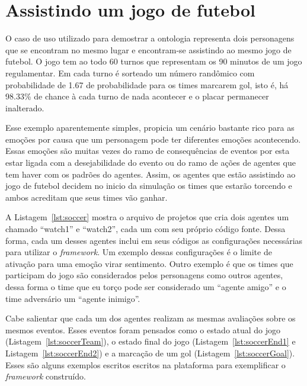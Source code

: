 \section{Assistindo um jogo de futebol} \label{ch:cdu:svc}

O caso de uso utilizado para demostrar a ontologia representa dois personagens
que se encontram no mesmo lugar e encontram-se assistindo ao mesmo jogo de
futebol. O jogo tem ao todo 60 turnos que representam os 90 minutos de um jogo
regulamentar. Em cada turno é sorteado um número randômico com probabilidade
de 1.67 de probabilidade para os times marcarem gol, isto é, há 98.33\% de
chance à cada turno de nada acontecer e o placar permanecer inalterado.

Esse exemplo aparentemente simples, propicia um cenário bastante rico para as
emoções por causa que um personagem pode ter diferentes emoções acontecendo.
Essas emoções são muitas vezes do ramo de consequências de eventos por esta
estar ligada com a desejabilidade do evento ou do ramo de ações de agentes que
tem haver com os padrões do agentes. Assim, os agentes que estão assistindo ao
jogo de futebol decidem no inicio da simulação os times que estarão torcendo e
ambos acreditam que seus times vão ganhar.

\begin{center}
    \begin{minipage}{140mm}
	\lstset{linewidth=140mm}
	
    \end{minipage}
\end{center}

A Listagem~\ref{lst:soccer} mostra o arquivo de projetos que cria dois agentes
um chamado ``watch1'' e ``watch2'', cada um com seu próprio código fonte.
Dessa forma, cada um desses agentes inclui em seus códigos as configurações
necessárias para utilizar o \emph{framework}. Um exemplo dessas configurações
é o limite de ativação para uma emoção virar sentimento. Outro exemplo é que
os times que participam do jogo são considerados pelos personagens como outros
agentes, dessa forma o time que eu torço pode ser considerado um ``agente
amigo'' e o time adversário um ``agente inimigo''.

Cabe salientar que cada um dos agentes realizam as mesmas avaliações sobre os
mesmos eventos. Esses eventos foram pensados como o estado atual do jogo
(Listagem~\ref{lst:soccerTeam}), o estado final do jogo
(Listagem~\ref{lst:soccerEnd1} e Listagem~\ref{lst:soccerEnd2}) e a marcação de um gol
(Listagem~\ref{lst:soccerGoal}). Esses são alguns exemplos escritos escritos
na plataforma \jason para exemplificar o \emph{framework} construído.

